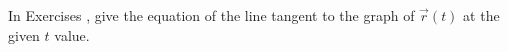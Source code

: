 {\noindent In Exercises}
{, give the equation of the line tangent to the graph of $\vec r(t)$ at the given $t$ value.  
}
